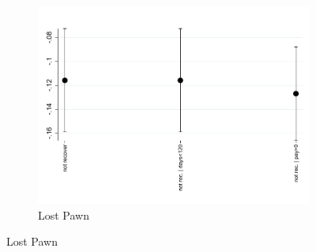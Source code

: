\documentclass[11pt]{article}
\begin{document}
\begin{figure}[H]
\begin{center}
\begin{subfigure}{0.55\textwidth}
        \caption{Lost Pawn}
        \centering
        \includegraphics[width=\textwidth]{Figuras/def_te_pro_2.pdf}
    \end{subfigure}
    \end{center}
        \scriptsize

\end{figure}
\end{document}
